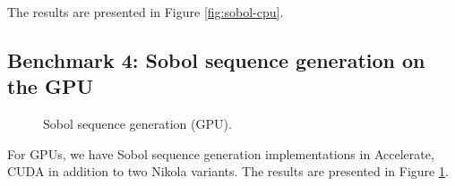 The results are presented in Figure \ref{fig:sobol-cpu}.

\subsection{Benchmark 4: Sobol sequence generation on the GPU}
\begin{figure}
	\centering
\begin{adjustbox}{minipage=1.3\textwidth,margin=0pt \smallskipamount,center}
\end{adjustbox}
  \caption{Sobol sequence generation (GPU).}
\label{fig:sobol-gpu}
\end{figure}

For GPUs, we have Sobol sequence generation implementations in
Accelerate, CUDA in addition to two Nikola variants. The results are
presented in Figure \ref{fig:sobol-gpu}. 

